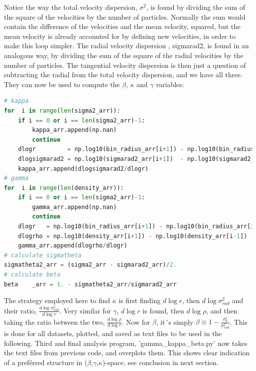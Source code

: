 Notice the way the total velocity dispersion, $\sigma^2$, is found by dividing the sum of the square of the velocities by the number of particles. Normally the sum would contain the difference of the velocities and the mean velocity, squared, but the mean velocity is already accounted for by defining new velocities, in order to make this loop simpler. The radial velocity dispersion , sigmarad2, is found in an analogous way, by dividing the sum of the square of the radial velocities by the number of particles. The tangential velocity dispersion is then just a question of subtracting the radial from the total velocity dispersion, and we have all three. They can now be used to compute the $ \beta$, $ \kappa$ and $ \gamma$ variables: \\

\begin{pythonstyle}
\begin{lstlisting}[language=Python]
# kappa 
for  i in range(len(sigma2_arr)): 
    if i == 0 or i == len(sigma2_arr)-1: 
        kappa_arr.append(np.nan) 
        continue 
    dlogr         = np.log10(bin_radius_arr[i+1]) - np.log10(bin_radius_arr[i-1]) 
    dlogsigmarad2 = np.log10(sigmarad2_arr[i+1])  - np.log10(sigmarad2_arr[i-1]) 
    kappa_arr.append(dlogsigmarad2/dlogr) 
# gamma 
for  i in range(len(density_arr)): 
    if i == 0 or i == len(sigma2_arr)-1: 
        gamma_arr.append(np.nan) 
        continue
    dlogr   = np.log10(bin_radius_arr[i+1]) - np.log10(bin_radius_arr[i-1])
    dlogrho = np.log10(density_arr[i+1]) - np.log10(density_arr[i-1])
    gamma_arr.append(dlogrho/dlogr)
# calculate sigmatheta 
sigmatheta2_arr = (sigma2_arr - sigmarad2_arr)/2. 
# calculate beta 
beta	_arr = 1. - sigmatheta2_arr/sigmarad2_arr 
\end{lstlisting}
\end{pythonstyle}

The strategy employed here to find $ \kappa$ is first finding $d \log r$, then $d \log \sigma_{rad}^2$ and their ratio, $\frac{d \log \sigma_{rad}^2}{d \log r}$. Very similar for $\gamma$, $d \log r$ is found, then $d \log \rho$, and then taking the ratio between the two, $\frac{d \log \rho}{d \log r}$. Now for $\beta$, it´s simply $ \beta \equiv 1 - \frac{\sigma_{\theta}^2}{\sigma_{rad}^2}$. This is done for all datasets, plotted, and saved as text files to be used in the following. Third and final analysis program, 'gamma\_kappa\_beta.py' now takes the text files from previous code, and overplots them. This shows clear indication of a preférred structure in ($\beta$,$\gamma$,$\kappa$)-space, see conclusion in next section.

